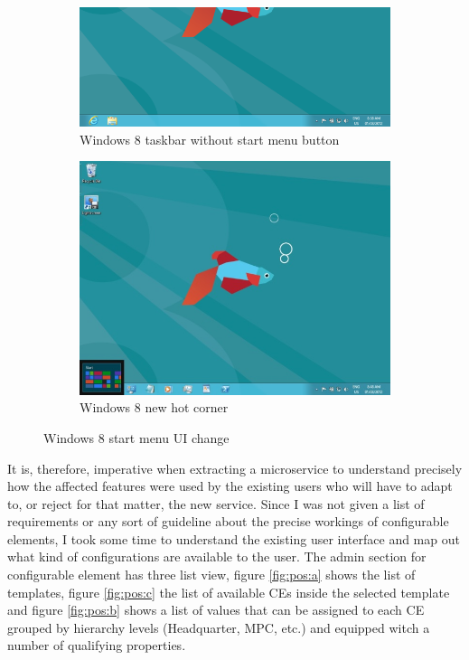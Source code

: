 \begin{figure}
  \begin{subfigure}[b]{0.5\linewidth}
    \includegraphics[width=\linewidth]{assets/windows-8-taskbar.png}
    \caption{Windows 8 taskbar without start menu button}
  \end{subfigure}
  \begin{subfigure}[b]{0.5\linewidth}
    \includegraphics[width=\linewidth]{assets/windows-8-hot-corner.jpg}
    \caption{Windows 8 new hot corner}
  \end{subfigure}
  \caption{Windows 8 start menu UI change}
  \label{fig:win8}
\end{figure}

It is, therefore, imperative when extracting a microservice to understand precisely how the affected features were used by the existing users who will have to adapt to, or reject for that matter, the new service. Since I was not given a list of requirements or any sort of guideline about the precise workings of configurable elements, I took some time to understand the existing user interface and map out what kind of configurations are available to the user. The admin section for configurable element has three list view, figure \ref{fig:pos:a} shows the list of templates, figure \ref{fig:pos:c} the list of available CEs inside the selected template and figure \ref{fig:pos:b} shows a list of values that can be assigned to each CE grouped by hierarchy levels (Headquarter, MPC, etc.) and equipped witch a number of qualifying properties.

